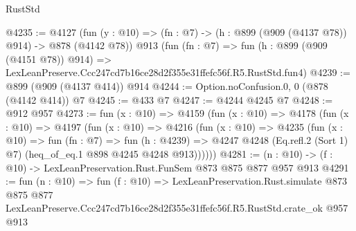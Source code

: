 \begin{lexlean}{RustStd}
\begin{coremodule}
@4235 := @4127
    (fun (y : @10) => (fn : @7) -> (h : @899 (@909 (@4137 @78)) @914) -> @878 (@4142 @78))
    @913
    (fun (fn : @7) =>
    fun (h : @899 (@909 (@4151 @78)) @914) =>
    LexLeanPreserve.Ccc247cd7b16ce28d2f355e31ffefc56f.R5.RustStd.fun4)
@4239 := @899 (@909 (@4137 @414)) @914
@4244 := Option.noConfusion.{0, 0} (@878 (@4142 @414)) @7
@4245 := @433 @7
@4247 := @4244 @4245 @7
@4248 := @912 @957
@4273 := fun (x : @10) =>
  @4159
    (fun (x : @10) =>
    @4178
      (fun (x : @10) =>
      @4197
        (fun (x : @10) =>
        @4216
          (fun (x : @10) =>
          @4235
            (fun (x : @10) =>
            fun (fn : @7) =>
            fun (h : @4239) =>
            @4247 @4248 (Eq.refl.{2} (Sort 1) @7) (heq_of_eq.{1} @898 @4245 @4248 @913))))))
@4281 := (n : @10) -> (f : @10) -> LexLeanPreservation.Rust.FunSem @873 @875 @877 @957 @913
@4291 := fun (n : @10) =>
  fun (f : @10) =>
  LexLeanPreservation.Rust.simulate
    @873
    @875
    @877
    LexLeanPreserve.Ccc247cd7b16ce28d2f355e31ffefc56f.R5.RustStd.crate_ok
    @957
    @913
\end{coremodule}
\end{lexlean}
